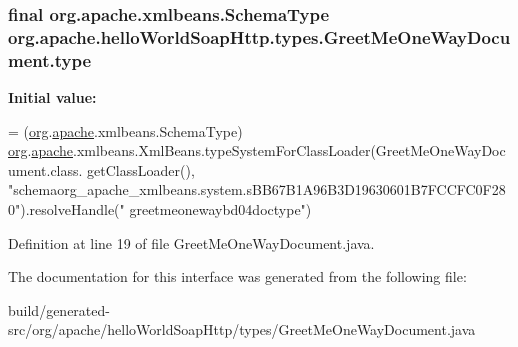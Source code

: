 \subsubsection[{type}]{\setlength{\rightskip}{0pt plus 5cm}final org.\+apache.\+xmlbeans.\+Schema\+Type org.\+apache.\+hello\+World\+Soap\+Http.\+types.\+Greet\+Me\+One\+Way\+Document.\+type\hspace{0.3cm}{\ttfamily [static]}}\label{interfaceorg_1_1apache_1_1hello_world_soap_http_1_1types_1_1_greet_me_one_way_document_a97ed524486fb095e79dcd25b062f80ed}
{\bfseries Initial value\+:}
\begin{DoxyCode}
= (\hyperlink{namespaceorg}{org}.\hyperlink{namespaceorg_1_1apache}{apache}.xmlbeans.SchemaType)
        \hyperlink{namespaceorg}{org}.\hyperlink{namespaceorg_1_1apache}{apache}.xmlbeans.XmlBeans.typeSystemForClassLoader(GreetMeOneWayDocument.class.
      getClassLoader(), \textcolor{stringliteral}{"schemaorg\_apache\_xmlbeans.system.sBB67B1A96B3D19630601B7FCCFC0F280"}).resolveHandle(\textcolor{stringliteral}{"
      greetmeonewaybd04doctype"})
\end{DoxyCode}


Definition at line 19 of file Greet\+Me\+One\+Way\+Document.\+java.



The documentation for this interface was generated from the following file\+:\begin{DoxyCompactItemize}
\item 
build/generated-\/src/org/apache/hello\+World\+Soap\+Http/types/Greet\+Me\+One\+Way\+Document.\+java\end{DoxyCompactItemize}
